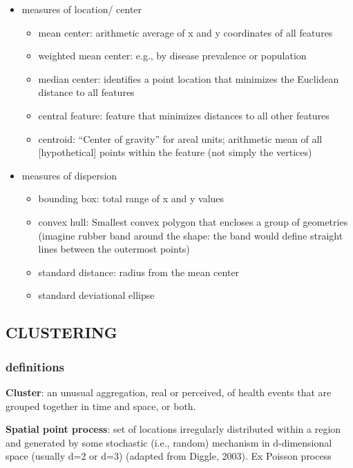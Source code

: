 \documentclass[
]{article}
\begin{document}
\begin{itemize}
\item
  measures of location/ center

  \begin{itemize}
  \item
    mean center: arithmetic average of x and y coordinates of all
    features
  \item
    weighted mean center: e.g., by disease prevalence or population
  \item
    median center: identifies a point location that minimizes the
    Euclidean distance to all features
  \item
    central feature: feature that minimizes distances to all other
    features
  \item
    centroid: ``Center of gravity'' for areal units; arithmetic mean of
    all {[}hypothetical{]} points within the feature (not simply the
    vertices)
  \end{itemize}
\item
  measures of dispersion

  \begin{itemize}
  \item
    bounding box: total range of x and y values
  \item
    convex hull: Smallest convex polygon that encloses a group of
    geometries (imagine rubber band around the shape: the band would
    define straight lines between the outermost points)
  \item
    standard distance: radius from the mean center
  \item
    standard deviational ellipse
  \end{itemize}
\end{itemize}

\hypertarget{clustering}{%
\subsection{CLUSTERING}\label{clustering}}

\hypertarget{definitions}{%
\subsubsection{definitions}\label{definitions}}

\textbf{Cluster}: an unusual aggregation, real or perceived, of health
events that are grouped together in time and space, or both.

\textbf{Spatial point process}: set of locations irregularly distributed
within a region and generated by some stochastic (i.e., random)
mechanism in d-dimensional space (usually d=2 or d=3) (adapted from
Diggle, 2003). Ex Poisson process
\end{document}
